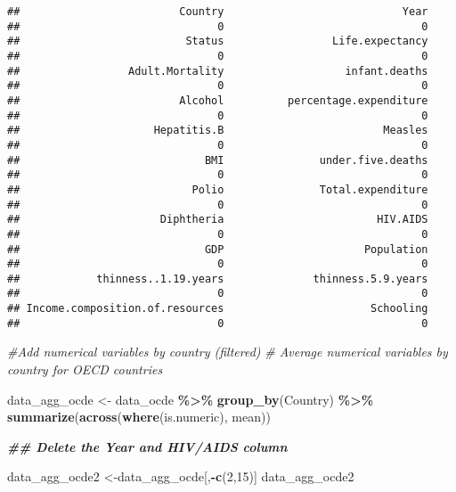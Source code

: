 \documentclass[
]{article}
\newenvironment{Shaded}{\begin{snugshade}}{\end{snugshade}}
\newcommand{\CommentTok}[1]{\textcolor[rgb]{0.56,0.35,0.01}{\textit{#1}}}
\newcommand{\DecValTok}[1]{\textcolor[rgb]{0.00,0.00,0.81}{#1}}
\newcommand{\DocumentationTok}[1]{\textcolor[rgb]{0.56,0.35,0.01}{\textbf{\textit{#1}}}}
\newcommand{\FunctionTok}[1]{\textcolor[rgb]{0.13,0.29,0.53}{\textbf{#1}}}
\newcommand{\NormalTok}[1]{#1}
\newcommand{\OtherTok}[1]{\textcolor[rgb]{0.56,0.35,0.01}{#1}}
\newcommand{\SpecialCharTok}[1]{\textcolor[rgb]{0.81,0.36,0.00}{\textbf{#1}}}
\begin{document}
\begin{verbatim}
##                         Country                            Year 
##                               0                               0 
##                          Status                 Life.expectancy 
##                               0                               0 
##                 Adult.Mortality                   infant.deaths 
##                               0                               0 
##                         Alcohol          percentage.expenditure 
##                               0                               0 
##                     Hepatitis.B                         Measles 
##                               0                               0 
##                             BMI               under.five.deaths 
##                               0                               0 
##                           Polio               Total.expenditure 
##                               0                               0 
##                      Diphtheria                        HIV.AIDS 
##                               0                               0 
##                             GDP                      Population 
##                               0                               0 
##            thinness..1.19.years              thinness.5.9.years 
##                               0                               0 
## Income.composition.of.resources                       Schooling 
##                               0                               0
\end{verbatim}

\begin{Shaded}
\begin{Highlighting}[]
\CommentTok{\#Add numerical variables by country (filtered)}
\CommentTok{\# Average numerical variables by country for OECD countries}

\NormalTok{data\_agg\_ocde }\OtherTok{\textless{}{-}}\NormalTok{ data\_ocde }\SpecialCharTok{\%\textgreater{}\%}
  \FunctionTok{group\_by}\NormalTok{(Country) }\SpecialCharTok{\%\textgreater{}\%}
  \FunctionTok{summarize}\NormalTok{(}\FunctionTok{across}\NormalTok{(}\FunctionTok{where}\NormalTok{(is.numeric), mean))}
\end{Highlighting}
\end{Shaded}

\begin{Shaded}
\begin{Highlighting}[]
\DocumentationTok{\#\# Delete the Year and HIV/AIDS column}

\NormalTok{data\_agg\_ocde2 }\OtherTok{\textless{}{-}}\NormalTok{data\_agg\_ocde[,}\SpecialCharTok{{-}}\FunctionTok{c}\NormalTok{(}\DecValTok{2}\NormalTok{,}\DecValTok{15}\NormalTok{)]  }
\NormalTok{data\_agg\_ocde2}
\end{Highlighting}
\end{Shaded}
\end{document}
